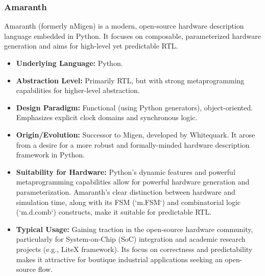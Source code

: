 \documentclass[sigconf, anonymous=false]{acmart} %
\begin{document}
\subsubsection{Amaranth}
Amaranth (formerly nMigen)\cite{AmaranthStdLib} is a modern, open-source hardware description language embedded in Python. It focuses on composable, parameterized hardware generation and aims for high-level yet predictable RTL.
\begin{itemize}
    \item \textbf{Underlying Language:} Python.
    \item \textbf{Abstraction Level:} Primarily RTL, but with strong metaprogramming capabilities for higher-level abstraction.
    \item \textbf{Design Paradigm:} Functional (using Python generators), object-oriented. Emphasizes explicit clock domains and synchronous logic.
    \item \textbf{Origin/Evolution:} Successor to Migen, developed by Whitequark. It arose from a desire for a more robust and formally-minded hardware description framework in Python.
    \item \textbf{Suitability for Hardware:} Python's dynamic features and powerful metaprogramming capabilities allow for powerful hardware generation and parameterization. Amaranth's clear distinction between hardware and simulation time, along with its FSM (`m.FSM`) and combinatorial logic (`m.d.comb`) constructs, make it suitable for predictable RTL.
    \item \textbf{Typical Usage:} Gaining traction in the open-source hardware community, particularly for System-on-Chip (SoC) integration and academic research projects (e.g., LiteX framework). Its focus on correctness and predictability makes it attractive for boutique industrial applications seeking an open-source flow.
\end{itemize}
\end{document}
